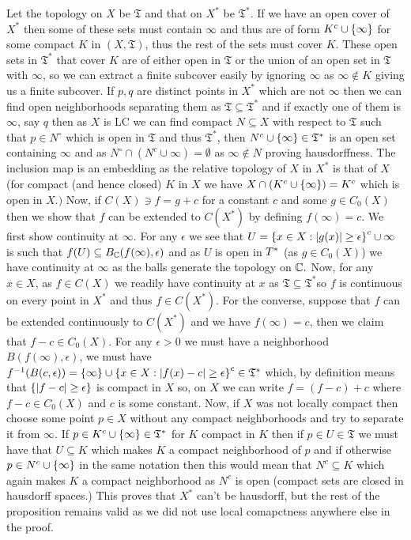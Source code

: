 \documentclass[12pt,a4paper]{article}
\begin{document}
\begin{solution}
Let the topology on $X$ be $\mathfrak T$ and that on $X^*$ be $\mathfrak T^*.$ 
If we have an open cover of $X^*$ then some of these sets must contain $\infty$ and thus are of form $K^c\cup \qty{\infty}$ for some compact $K$ in $(X,\mathfrak T)$, thus the rest of the sets  must cover $K$. 
These open sets in $\mathfrak T^*$ that cover $K$ are of either open in $\mathfrak T$ or the union of an open set in $\mathfrak T$ with $\infty$, so we can extract a finite subcover easily by ignoring $\infty$ as $\infty\not\in K$ giving us a finite subcover. 
If $p,q$ are distinct points in $X^*$ which are not $\infty$ then we can find open neighborhoods separating them as $\mathfrak T \subseteq \mathfrak T^*$ and if exactly one of them is $\infty$, say $q$ then as $X$ is LC we can find compact $N \subseteq X$ with respect to $\mathfrak T$ such that $p\in N^\circ$ which is open in $\mathfrak T$ and thus $\mathfrak T^*$, then $N^c\cup \qty{\infty}\in \mathfrak T^*$ is an open set containing $\infty$ and as $N^\circ\cap(N^c\cup\infty)=\emptyset$ as $\infty\notin N$ proving hausdorffness. 
The inclusion map is an embedding as the relative topology of $X$ in $X^*$ is that of $X$ (for compact (and hence closed) $K$ in $X$ we have  $X\cap(K^c\cup \qty{\infty})=K^c$ which is open in $X.)$ 
Now, if $C(X)\ni f=g+c$ for a constant $c$ and some $g\in C_0(X)$ then we show that $f$ can be extended to $C(X^*)$ by defining $f(\infty)=c.$ 
We first show continuity at $\infty.$ 
For any $\epsilon$ we see that $U=\qty{x\in X:|g(x)|\geq\epsilon}^c\cup\infty$ is such that $f(U) \subseteq B_{\mathbb{C}}(f(\infty),\epsilon)$ and as $U$ is open in $\mathfrak \mathfrak T^*$ (as $g\in C_0(X)$) we have continuity at $\infty$ as the balls generate the topology on $\mathbb{C}.$ 
Now, for any $x\in X$, as $f\in C(X)$ we readily have continuity at $x$ as $\mathfrak T \subseteq \mathfrak T^*$so $f$ is continuous on every point in $X^*$ and thus $f\in C(X^*).$ 
For the converse, suppose that $f$ can be extended continuously to $C(X^*)$ and we have $f(\infty)=c$, then we claim that $f-c\in C_0(X).$ 
For any $\epsilon>0$ we must have a neighborhood $B(f(\infty),\epsilon)$, we must have $f^{-1}(B(c,\epsilon))= \qty{\infty}\cup \qty{x\in X:|f(x)-c|\geq\epsilon}^c\in \mathfrak T^*$ which, by definition means that $ \qty{|f-c|\geq\epsilon}$ is compact in $X$ so, on $X$ we can write $f=(f-c)+c$ where $f-c\in C_0(X)$ and $c$ is some constant. 
Now, if $X$ was not locally compact then choose some point $p\in X$ without any compact neighborhoods and try to separate it from $\infty.$ 
If $p\in K^c\cup \qty{\infty}\in\mathfrak T^*$ for $K$ compact in $K$ then if $p\in U\in\mathfrak T$ we must have that $U\subseteq K$ which makes $K$ a compact neighborhood of $p$ and if otherwise $p\in N^c\cup \qty{\infty}$ in the same notation then this would mean that $N^c \subseteq K$ which again makes $K$ a compact neighborhood as $N^c$ is open (compact sets are closed in hausdorff spaces.) 
This proves that $X^*$ can't be hausdorff, but the rest of the proposition remains valid as we did not use local comapctness anywhere else in the proof. 
\end{solution}
\end{document}
